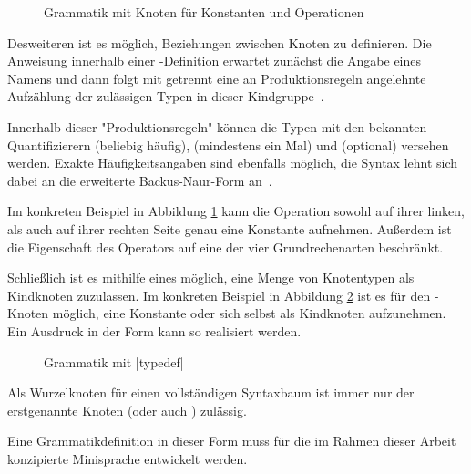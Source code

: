 \begin{figure}[h]
  
  \caption{Grammatik mit Knoten für Konstanten und Operationen}
  \label{fig:basics:grammars:2}
\end{figure}

Desweiteren ist es möglich, Beziehungen zwischen Knoten zu definieren. Die Anweisung  innerhalb einer -Definition erwartet zunächst die Angabe eines Namens und dann folgt mit \inlinec{::=} getrennt eine an Produktionsregeln angelehnte Aufzählung der zulässigen Typen in dieser Kindgruppe~\cite[6]{riemer2018}.

Innerhalb dieser "Produktionsregeln" können die Typen mit den bekannten Quantifizierern \inlinec{*} (beliebig häufig), \inlinec{+} (mindestens ein Mal) und  (optional) versehen werden. Exakte Häufigkeitsangaben sind ebenfalls möglich, die Syntax lehnt sich dabei an die erweiterte Backus-Naur-Form an~\cite[6]{riemer2018}.

Im konkreten Beispiel in Abbildung \ref{fig:basics:grammars:2} kann die Operation  sowohl auf ihrer linken, als auch auf ihrer rechten Seite genau eine Konstante aufnehmen. Außerdem ist die Eigenschaft des Operators auf eine der vier Grundrechenarten beschränkt.

Schließlich ist es mithilfe eines  möglich, eine Menge von Knotentypen als Kindknoten zuzulassen. Im konkreten Beispiel in Abbildung \ref{fig:basics:grammars:3} ist es für den -Knoten möglich, eine Konstante oder sich selbst als Kindknoten aufzunehmen. Ein Ausdruck in der Form  kann so realisiert werden.

\begin{figure}[h]
  
  \caption{Grammatik mit \inlinec|typedef|}
  \label{fig:basics:grammars:3}
\end{figure}

Als Wurzelknoten für einen vollständigen Syntaxbaum ist immer nur der erstgenannte Knoten (oder auch ) zulässig.

Eine Grammatikdefinition in dieser Form muss für die im Rahmen dieser Arbeit konzipierte Minisprache entwickelt werden.
